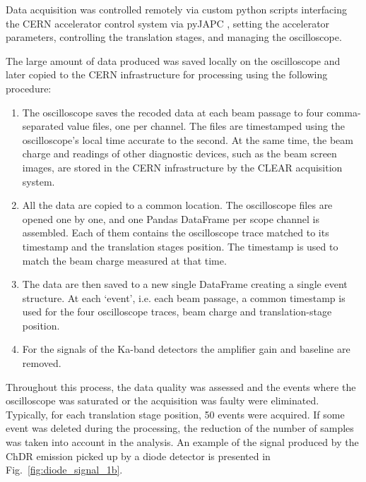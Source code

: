 Data acquisition was controlled remotely via custom python scripts interfacing the CERN accelerator control system via pyJAPC \cite{pyJAPC}, setting the accelerator parameters, controlling the translation stages, and managing the oscilloscope. 


The large amount of data produced was saved locally on the oscilloscope and later copied to the CERN infrastructure for processing using the following procedure:
\begin{enumerate}
    \item The oscilloscope saves the recoded data at each beam passage to four comma-separated value files, one per channel. The files are timestamped using the oscilloscope's local time accurate to the second. At the same time, the beam charge and readings of other diagnostic devices, such as the beam screen images, are stored in the CERN infrastructure by the CLEAR acquisition system.
    \item All the data are copied to a common location. The oscilloscope files are opened one by one, and one Pandas \cite{pandas} DataFrame per scope channel is assembled. Each of them contains the oscilloscope trace matched to its timestamp and the translation stages position. The timestamp is used to match the beam charge measured at that time. 
    \item The data are then saved to a new single DataFrame creating a single event structure. At each `event', i.e. each beam passage, a common timestamp is used for the four oscilloscope traces, beam charge and translation-stage position.
    \item For the signals of the Ka-band detectors the amplifier gain and baseline are removed. 
\end{enumerate}
Throughout this process, the data quality was assessed and the events where the oscilloscope was saturated or the acquisition was faulty were eliminated. Typically, for each translation stage position, 50 events were acquired. If some event was deleted during the processing, the reduction of the number of samples was taken into account in the analysis. An example of the signal produced by the ChDR emission picked up by a diode detector is presented in Fig.~\ref{fig:diode_signal_1b}. 


